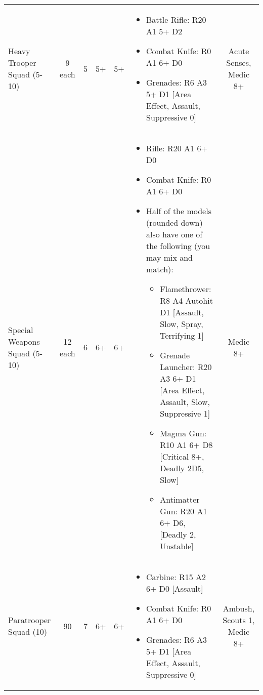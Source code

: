 \documentclass[landscape]{extarticle}
\begin{document}
\begin{small}
\begin{tabular}{UccccWS}
Heavy Trooper Squad (5-10)
&
9 each
&
5
&
5+
&
5+
&
\begin{itemize}
    \item Battle Rifle: R20 A1 5+ D2
    \item Combat Knife: R0 A1 6+ D0
    \item Grenades: R6 A3 5+ D1 [Area Effect, Assault, Suppressive 0]
\end{itemize}
&
Acute Senses, Medic 8+



\\



Special Weapons Squad (5-10)
&
12 each
&
6
&
6+
&
6+
&
\begin{itemize}
    \item Rifle: R20 A1 6+ D0
    \item Combat Knife: R0 A1 6+ D0
    \item Half of the models (rounded down) also have one of the following (you may mix and match):
    \begin{itemize}
        \item Flamethrower: R8 A4 Autohit D1 [Assault, Slow, Spray, Terrifying 1]
        \item Grenade Launcher: R20 A3 6+ D1 [Area Effect, Assault, Slow, Suppressive 1]
        \item Magma Gun: R10 A1 6+ D8 [Critical 8+, Deadly 2D5, Slow]
        \item Antimatter Gun: R20 A1 6+ D6, [Deadly 2, Unstable]
    \end{itemize}
\end{itemize}
&
Medic 8+



\\



Paratrooper Squad (10)
&
90
&
7
&
6+
&
6+
&
\begin{itemize}
    \item Carbine: R15 A2 6+ D0 [Assault]
    \item Combat Knife: R0 A1 6+ D0
    \item Grenades: R6 A3 5+ D1 [Area Effect, Assault, Suppressive 0]
\end{itemize}
&
Ambush, Scouts 1, Medic 8+




\end{tabular}
\end{small}
\end{document}
